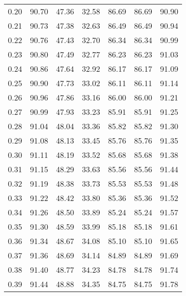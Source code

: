 \begin{tabular}{|c|c|c|c|c|c|c|}
      0.20 &     90.70 &     47.36 &      32.58 &   86.69 &      86.69 &         90.90 \\
      0.21 &     90.73 &     47.38 &      32.63 &   86.49 &      86.49 &         90.94 \\
      0.22 &     90.76 &     47.43 &      32.70 &   86.34 &      86.34 &         90.99 \\
      0.23 &     90.80 &     47.49 &      32.77 &   86.23 &      86.23 &         91.03 \\
      0.24 &     90.86 &     47.64 &      32.92 &   86.17 &      86.17 &         91.09 \\
      0.25 &     90.90 &     47.73 &      33.02 &   86.11 &      86.11 &         91.14 \\
      0.26 &     90.96 &     47.86 &      33.16 &   86.00 &      86.00 &         91.21 \\
      0.27 &     90.99 &     47.93 &      33.23 &   85.91 &      85.91 &         91.25 \\
      0.28 &     91.04 &     48.04 &      33.36 &   85.82 &      85.82 &         91.30 \\
      0.29 &     91.08 &     48.13 &      33.45 &   85.76 &      85.76 &         91.35 \\
      0.30 &     91.11 &     48.19 &      33.52 &   85.68 &      85.68 &         91.38 \\
      0.31 &     91.15 &     48.29 &      33.63 &   85.56 &      85.56 &         91.44 \\
      0.32 &     91.19 &     48.38 &      33.73 &   85.53 &      85.53 &         91.48 \\
      0.33 &     91.22 &     48.42 &      33.80 &   85.36 &      85.36 &         91.52 \\
      0.34 &     91.26 &     48.50 &      33.89 &   85.24 &      85.24 &         91.57 \\
      0.35 &     91.30 &     48.59 &      33.99 &   85.18 &      85.18 &         91.61 \\
      0.36 &     91.34 &     48.67 &      34.08 &   85.10 &      85.10 &         91.65 \\
      0.37 &     91.36 &     48.69 &      34.14 &   84.89 &      84.89 &         91.69 \\
      0.38 &     91.40 &     48.77 &      34.23 &   84.78 &      84.78 &         91.74 \\
      0.39 &     91.44 &     48.88 &      34.35 &   84.75 &      84.75 &         91.78 \\

\end{tabular}
